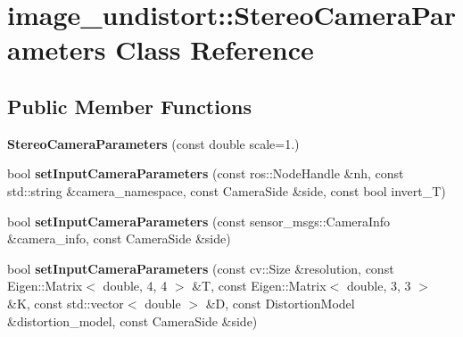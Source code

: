 \hypertarget{classimage__undistort_1_1StereoCameraParameters}{}\section{image\+\_\+undistort\+:\+:Stereo\+Camera\+Parameters Class Reference}
\label{classimage__undistort_1_1StereoCameraParameters}
\subsection*{Public Member Functions}
\begin{DoxyCompactItemize}
\item 
\mbox{\label{classimage__undistort_1_1StereoCameraParameters_a22876c8f89132297fe41d2e99b35f231}} 
{\bfseries Stereo\+Camera\+Parameters} (const double scale=1.)
\item 
\mbox{\label{classimage__undistort_1_1StereoCameraParameters_a010ab6f2db2ef20fc9d3d420c4c27c0c}} 
bool {\bfseries set\+Input\+Camera\+Parameters} (const ros\+::\+Node\+Handle \&nh, const std\+::string \&camera\+\_\+namespace, const Camera\+Side \&side, const bool invert\+\_\+T)
\item 
\mbox{\label{classimage__undistort_1_1StereoCameraParameters_a444a557b5868e2cf61dbe1deea99ae4f}} 
bool {\bfseries set\+Input\+Camera\+Parameters} (const sensor\+\_\+msgs\+::\+Camera\+Info \&camera\+\_\+info, const Camera\+Side \&side)
\item 
\mbox{\label{classimage__undistort_1_1StereoCameraParameters_ac14d07d342d4dae4668711b00360643b}} 
bool {\bfseries set\+Input\+Camera\+Parameters} (const cv\+::\+Size \&resolution, const Eigen\+::\+Matrix$<$ double, 4, 4 $>$ \&T, const Eigen\+::\+Matrix$<$ double, 3, 3 $>$ \&K, const std\+::vector$<$ double $>$ \&D, const Distortion\+Model \&distortion\+\_\+model, const Camera\+Side \&side)
\item 
\mbox{\label{classimage__undistort_1_1StereoCameraParameters_a65100054bd0ce1297488a639e1632388}} 

\end{DoxyCompactItemize}
